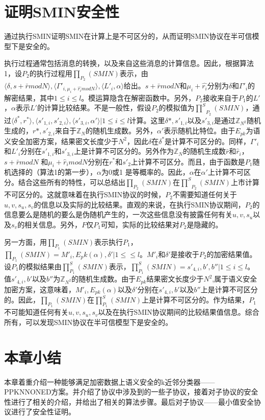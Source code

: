 \section{证明SMIN安全性}
通过执行SMIN证明SMIN在计算上是不可区分的，从而证明SMIN协议在半可信模型下是安全的。

执行过程通常包括消息的转换，以及来自这些消息的计算信息。因此，根据算法1，设$P_2$的执行过程用$\prod_{P_2}(SMIN)$表示，由${\langle \delta,s+\bar{r} mod N\rangle,\langle \Gamma'_{i,\mu_i + \hat{r_i} mod N}\rangle,\langle L'_i,\alpha \rangle}$给出。$s+\bar{r}mod N$和$\mu_i + \hat{r_i}$分别为$\delta$和$\Gamma'_i$的解密结果，其中$1 \leq i \leq l$。模运算隐含在解密函数中。另外，$P_2$接收来自于$P_1$的$L'$，$\alpha$表示$L'$的计算比较结果。不是一般性，假设$P_2$的模拟值为${\prod^S}_{P_2}(SMIN)$，通过${\langle \delta^*,r^* \rangle,\langle s'_{1,i},s'_{2,i}\rangle,\langle s'_{3,i},\alpha'\rangle| 1 \leq i \leq l}$计算。这里$\delta*,s'_{1,i}$以及$s'_{3,i}$是通过$\mathbb{Z}_{N^2}$随机生成的，$r*,s'_{2,i}$来自于$\mathbb{Z}_N$的随机生成数。另外，$\alpha'$表示随机比特位。由于$E_{pk}$为语义安全加密方案，结果密文长度少于$N^2$，因此$\delta$在$\delta^*$是计算不可区分的。同样，$\Gamma'_i$和$L'_i$分别在$s'_{1,i}$和$s'_{3,i}$上是计算不可区分的。另外作为$\mathbb{Z}_N$的随机生成数$\bar{r}$和$\hat{r}_i$，$s+\bar{r}mod N$ 和$\mu_i + \hat{r}_i mod N$分别在$r^*$和$s'_2$上计算不可区分。而且，由于函数是$P_1$随机选择的（算法1的第一步），$\alpha$为0或1 是等概率的。因此，$\alpha$在$\alpha'$上计算不可区分。结合这些所有的特性，可以总结出$\prod_{P_2}(SMIN)$在${\prod ^S}_{P_2}(SMIN)$上市计算不可区分的。这就意味着在执行SMIN协议的时候，$P_2$不需要知道任何关于$u,v,s_u,s_v$的信息以及实际的比较结果。直观的来说，在执行SMIN协议期间，$P_2$的信息要么是随机的要么是伪随机产生的，一次这些信息没有披露任何有关$u,v,s_u$以及$s_v$的相关信息。另外，$F$仅$P_1$可知，实际的比较结果对$P_2$是隐藏的。

另一方面，用$\prod_{P_1}(SMIN)$表示执行$P_1$，$\prod_{P_1}(SMIN)={M'_i,E_pk(\alpha),\delta'|1 \leq \leq l}$。$M'_i$和$\delta'$是接收于$P_2$的加密结果值。设$P_1$的模拟结果由$\prod^S_{P_1}(SMIN)$表示，$\prod^S_{P_1}(SMIN)={s'_{4,i},b',b''|1 \leq i \leq l}$。
值$s'_{4,i},b'$以及$b''$为$\mathbb{Z}_{N^2}$的随机生成数。由于$E_{pk}$结果密文长度少于$N^2$,属于语义安全加密方案，这意味着，$M'_i,E_{pk}(\alpha)$以及$\delta'$分别在$s'_{4,i},b'$以及$b''$上是计算不可区分的。因此，$\prod_{P_1}(SMIN)$在$\prod^S_{P_1}(SMIN)$上是计算不可区分的。作为结果，$P_1$不可能知道任何有关$u,v,s_u,s_v$以及在执行SMIN协议期间的比较结果值信息。综合所有，可以发现SMIN协议在半可信模型下是安全的。

\section{本章小结}
本章着重介绍一种能够满足加密数据上语义安全的k近邻分类器——PPKNNONED方案。并介绍了协议中涉及到的一些子协议，接着对子协议的安全性进行了相关的介绍，并给出了相关的算法步骤。最后对子协议——最小值安全协议进行了安全性证明。


